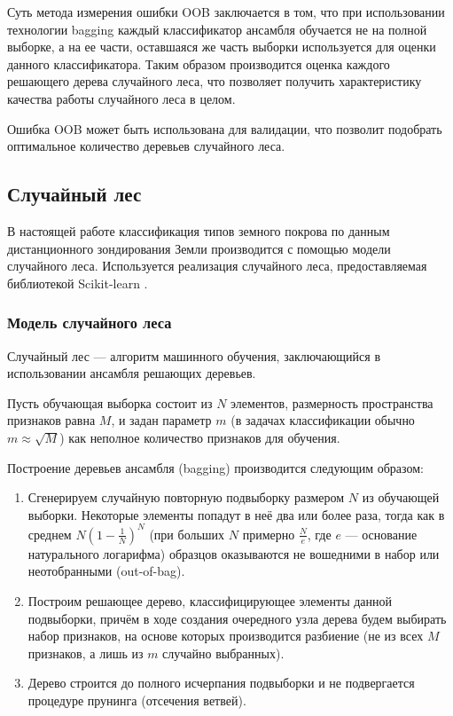 \documentclass[14pt, a4paper, oneside]{extarticle}
\begin{document}
Суть метода измерения ошибки OOB заключается в том, что при использовании технологии bagging каждый классификатор ансамбля обучается не на полной выборке, а на ее части, оставшаяся же часть выборки используется для оценки данного классификатора. Таким образом производится оценка каждого решающего дерева случайного леса, что позволяет получить характеристику качества работы случайного леса в целом.

Ошибка OOB может быть использована для валидации, что позволит подобрать оптимальное количество деревьев случайного леса.

\subsection{Случайный лес}
В настоящей работе классификация типов земного покрова по данным дистанционного зондирования Земли производится с помощью модели случайного леса. Используется реализация случайного леса, предоставляемая библиотекой Scikit-learn \cite{sklearn}.

\subsubsection{Модель случайного леса}
Случайный лес --- алгоритм машинного обучения, заключающийся в использовании ансамбля решающих деревьев.

Пусть обучающая выборка состоит из $N$ элементов, размерность пространства признаков равна $M$, и задан параметр $m$ (в задачах классификации обычно $m \approx \sqrt{M}$) как неполное количество признаков для обучения.

Построение деревьев ансамбля (bagging) производится следующим образом:
\begin{enumerate}
    \item Сгенерируем случайную повторную подвыборку размером $N$ из обучающей выборки. Некоторые элементы попадут в неё два или более раза, тогда как в среднем $N(1-\frac{1}{N})^N$ (при больших $N$ примерно $\frac{N}{e}$, где $e$ --- основание натурального логарифма) образцов оказываются не вошедними в набор или неотобранными (out-of-bag).
    \item Построим решающее дерево, классифицирующее элементы данной подвыборки, причём в ходе создания очередного узла дерева будем выбирать набор признаков, на основе которых производится разбиение (не из всех $M$ признаков, а лишь из $m$ случайно выбранных).
    \item Дерево строится до полного исчерпания подвыборки и не подвергается процедуре прунинга (отсечения ветвей).
\end{enumerate}
\end{document}
